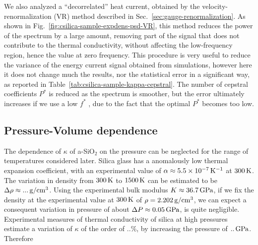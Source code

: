 We also analyzed a ``decorrelated'' heat current, obtained by the velocity-renormalization (VR) method described in Sec.~\ref{sec:gauge-renormalization}. As shown in Fig.~\ref{fig:csilica-sample-expdens-psd-VR}, this method reduces the power of the spectrum by a large amount, removing part of the signal that does not contribute to the thermal conductivity, without affecting the low-frequency region, hence the value at zero frequency. 
This procedure is very useful to reduce the variance of the energy current signal obtained from \abinitio simulations, however here it does not change much the results, nor the statistical error in a significant way, as reported in Table~\ref{tab:csilica-sample-kappa-cepstral}. 
The number of cepstral coefficients $P^*$ is reduced as the spectrum is smoother, but the error ultimately increases if we use a low $f^*$ , due to the fact that the optimal $P^*$ becomes too low. 



\subsection{Pressure-Volume dependence}
The dependence of $\kappa$ of a-SiO$_2$ on the pressure can be neglected for the range of temperatures considered later. 
Silica glass has a anomalously low thermal expansion coefficient, with an experimental value of $\alpha\approx 5.5\times 10^{-7} \,\mathrm{K^{-1}}$ at $300\,\mathrm{K}$. 
The variation in density from $300\,\mathrm{K}$ to $1500\,\mathrm{K}$ can be estimated to be $\Delta\rho \approx ... \,\mathrm{g/cm^3}$.
Using the experimental bulk modulus $K\approx 36.7\,\mathrm{GPa}$, if we fix the density at the experimental value at $300\,\mathrm{K}$ of $\rho=2.202\,\mathrm{g/cm^3}$, we can expect a consequent variation in pressure of about $\Delta P \approx 0.05\,\mathrm{GPa}$, is quite negligible. 
Experimental measures of thermal conductivity of silica at high pressures estimate a variation of $\kappa$ of the order of $..\%$, by increasing the pressure of $..\,\mathrm{GPa}$. Therefore 

